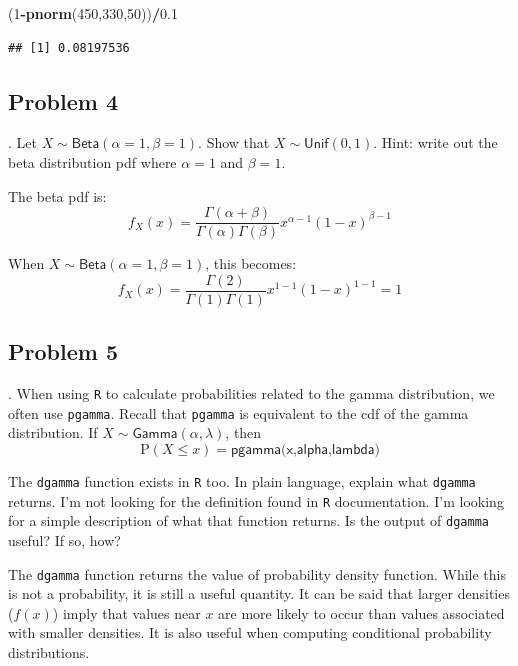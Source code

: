 \documentclass[
]{book}
\newenvironment{Shaded}{\begin{snugshade}}{\end{snugshade}}
\newcommand{\DecValTok}[1]{\textcolor[rgb]{0.00,0.00,0.81}{#1}}
\newcommand{\FloatTok}[1]{\textcolor[rgb]{0.00,0.00,0.81}{#1}}
\newcommand{\KeywordTok}[1]{\textcolor[rgb]{0.13,0.29,0.53}{\textbf{#1}}}
\newcommand{\NormalTok}[1]{#1}
\newcommand{\OperatorTok}[1]{\textcolor[rgb]{0.81,0.36,0.00}{\textbf{#1}}}
\begin{document}
\begin{Shaded}
\begin{Highlighting}[]
\NormalTok{(}\DecValTok{1}\OperatorTok{-}\KeywordTok{pnorm}\NormalTok{(}\DecValTok{450}\NormalTok{,}\DecValTok{330}\NormalTok{,}\DecValTok{50}\NormalTok{))}\OperatorTok{/}\FloatTok{0.1}
\end{Highlighting}
\end{Shaded}

\begin{verbatim}
## [1] 0.08197536
\end{verbatim}

\newpage

\hypertarget{problem-4-4}{%
\subsection{Problem 4}\label{problem-4-4}}

. Let \(X \sim \textsf{Beta}(\alpha=1,\beta=1)\). Show that \(X\sim \textsf{Unif}(0,1)\). Hint: write out the beta distribution pdf where \(\alpha=1\) and \(\beta=1\).

The beta pdf is:
\[
f_X(x)=\frac{\Gamma(\alpha + \beta)}{\Gamma(\alpha)\Gamma(\beta)}x^{\alpha-1}(1-x)^{\beta-1}
\]

When \(X\sim\textsf{Beta}(\alpha=1,\beta=1)\), this becomes:
\[
f_X(x)=\frac{\Gamma(2)}{\Gamma(1)\Gamma(1)}x^{1-1}(1-x)^{1-1} = 1
\]

\hypertarget{problem-5-3}{%
\subsection{Problem 5}\label{problem-5-3}}

. When using \texttt{R} to calculate probabilities related to the gamma distribution, we often use \texttt{pgamma}. Recall that \texttt{pgamma} is equivalent to the cdf of the gamma distribution. If \(X\sim\textsf{Gamma}(\alpha,\lambda)\), then
\[
\mbox{P}(X\leq x)=\textsf{pgamma(x,alpha,lambda)}
\]

The \texttt{dgamma} function exists in \texttt{R} too. In plain language, explain what \texttt{dgamma} returns. I'm not looking for the definition found in \texttt{R} documentation. I'm looking for a simple description of what that function returns. Is the output of \texttt{dgamma} useful? If so, how?

The \texttt{dgamma} function returns the value of probability density function. While this is not a probability, it is still a useful quantity. It can be said that larger densities (\(f(x)\)) imply that values near \(x\) are more likely to occur than values associated with smaller densities. It is also useful when computing conditional probability distributions.
\end{document}
